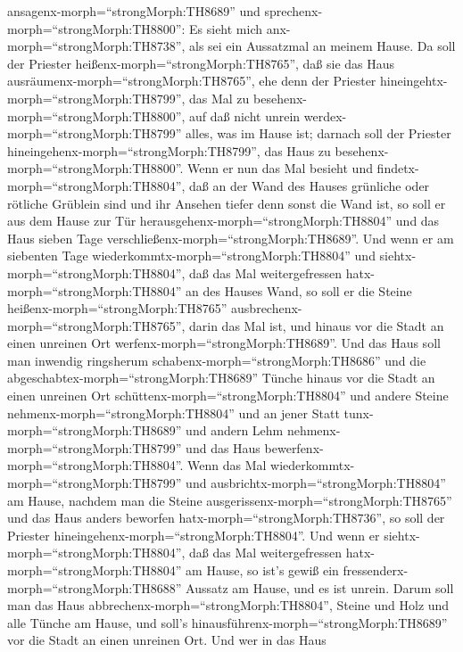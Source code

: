 ansagenx-morph=``strongMorph:TH8689'' und
sprechenx-morph=``strongMorph:TH8800'': Es sieht mich
anx-morph=``strongMorph:TH8738'', als sei ein Aussatzmal an meinem
Hause.  Da soll der Priester
heißenx-morph=``strongMorph:TH8765'', daß sie das Haus
ausräumenx-morph=``strongMorph:TH8765'', ehe denn der Priester
hineingehtx-morph=``strongMorph:TH8799'', das Mal zu
besehenx-morph=``strongMorph:TH8800'', auf daß nicht unrein
werdex-morph=``strongMorph:TH8799'' alles, was im Hause ist; darnach
soll der Priester hineingehenx-morph=``strongMorph:TH8799'', das Haus zu
besehenx-morph=``strongMorph:TH8800''.  Wenn er nun das Mal
besieht und findetx-morph=``strongMorph:TH8804'', daß an der Wand des
Hauses grünliche oder rötliche Grüblein sind und ihr Ansehen tiefer denn
sonst die Wand ist,  so soll er aus dem Hause zur Tür
herausgehenx-morph=``strongMorph:TH8804'' und das Haus sieben Tage
verschließenx-morph=``strongMorph:TH8689''.  Und wenn er am
siebenten Tage wiederkommtx-morph=``strongMorph:TH8804'' und
siehtx-morph=``strongMorph:TH8804'', daß das Mal weitergefressen
hatx-morph=``strongMorph:TH8804'' an des Hauses Wand,  so
soll er die Steine heißenx-morph=``strongMorph:TH8765''
ausbrechenx-morph=``strongMorph:TH8765'', darin das Mal ist, und hinaus
vor die Stadt an einen unreinen Ort
werfenx-morph=``strongMorph:TH8689''.  Und das Haus soll
man inwendig ringsherum schabenx-morph=``strongMorph:TH8686'' und die
abgeschabtex-morph=``strongMorph:TH8689'' Tünche hinaus vor die Stadt an
einen unreinen Ort schüttenx-morph=``strongMorph:TH8804'' 
und andere Steine nehmenx-morph=``strongMorph:TH8804'' und an jener
Statt tunx-morph=``strongMorph:TH8689'' und andern Lehm
nehmenx-morph=``strongMorph:TH8799'' und das Haus
bewerfenx-morph=``strongMorph:TH8804''.  Wenn das Mal
wiederkommtx-morph=``strongMorph:TH8799'' und
ausbrichtx-morph=``strongMorph:TH8804'' am Hause, nachdem man die Steine
ausgerissenx-morph=``strongMorph:TH8765'' und das Haus anders beworfen
hatx-morph=``strongMorph:TH8736'',  so soll der Priester
hineingehenx-morph=``strongMorph:TH8804''. Und wenn er
siehtx-morph=``strongMorph:TH8804'', daß das Mal weitergefressen
hatx-morph=``strongMorph:TH8804'' am Hause, so ist's gewiß ein
fressenderx-morph=``strongMorph:TH8688'' Aussatz am Hause, und es ist
unrein.  Darum soll man das Haus
abbrechenx-morph=``strongMorph:TH8804'', Steine und Holz und alle Tünche
am Hause, und soll's hinausführenx-morph=``strongMorph:TH8689'' vor die
Stadt an einen unreinen Ort.  Und wer in das Haus
